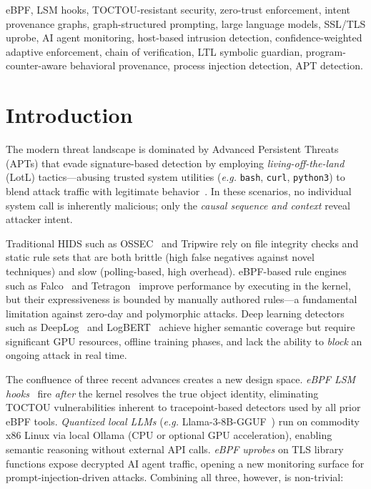 \documentclass[journal]{IEEEtran}
\newcommand{\eg}{\textit{e.g.}}
\begin{document}
\begin{IEEEkeywords}
eBPF, LSM hooks, TOCTOU-resistant security, zero-trust enforcement,
intent provenance graphs, graph-structured prompting, large language models,
SSL/TLS uprobe, AI agent monitoring, host-based intrusion detection,
confidence-weighted adaptive enforcement, chain of verification,
LTL symbolic guardian, program-counter-aware behavioral provenance,
process injection detection, APT detection.
\end{IEEEkeywords}

\section{Introduction}\label{sec:intro}

The modern threat landscape is dominated by Advanced Persistent Threats (APTs)
that evade signature-based detection by employing \emph{living-off-the-land}
(LotL) tactics---abusing trusted system utilities (\eg{} \texttt{bash},
\texttt{curl}, \texttt{python3}) to blend attack traffic with legitimate
behavior~\cite{darpa_tc}.  In these scenarios, no individual system call
is inherently malicious; only the \emph{causal sequence and context} reveal
attacker intent.

Traditional HIDS such as OSSEC~\cite{ossec} and Tripwire rely on file
integrity checks and static rule sets that are both brittle (high false
negatives against novel techniques) and slow (polling-based, high overhead).
eBPF-based rule engines such as Falco~\cite{falco} and
Tetragon~\cite{tetragon} improve performance by executing in the kernel, but
their expressiveness is bounded by manually authored rules---a fundamental
limitation against zero-day and polymorphic attacks.
Deep learning detectors such as DeepLog~\cite{deeplog} and
LogBERT~\cite{logbert} achieve higher semantic coverage but require
significant GPU resources, offline training phases, and lack the ability to
\emph{block} an ongoing attack in real time.

The confluence of three recent advances creates a new design space.
\emph{eBPF LSM hooks}~\cite{bpf_lsm_kernel} fire \emph{after} the kernel
resolves the true object identity, eliminating TOCTOU vulnerabilities inherent
to tracepoint-based detectors used by all prior eBPF tools.
\emph{Quantized local LLMs} (\eg{} Llama-3-8B-GGUF~\cite{llama3}) run on
commodity x86 Linux via local Ollama (CPU or optional GPU acceleration),
enabling semantic reasoning without external API calls.
\emph{eBPF uprobes} on TLS library functions expose decrypted AI agent traffic,
opening a new monitoring surface for prompt-injection-driven attacks.
Combining all three, however, is non-trivial:
\end{document}
